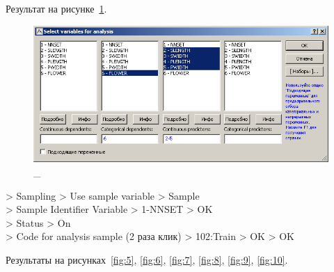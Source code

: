 Результат на рисунке~\ref{fig:4}.

\begin{figure}[!h]
  \centering

  \includegraphics[width=12cm]
  {inc/ex_4.PNG}

  \caption{\_}

  \label{fig:4}
\end{figure}

> Sampling > Use sample variable > Sample \\
> Sample Identifier Variable > 1-NNSET > OK \\
> Status > On \\
> Code for analysis sample (2 раза клик) > 102:Train > OK > OK

Результаты на рисунках~\ref{fig:5}, \ref{fig:6}, \ref{fig:7},
\ref{fig:8}, \ref{fig:9}, \ref{fig:10}.


